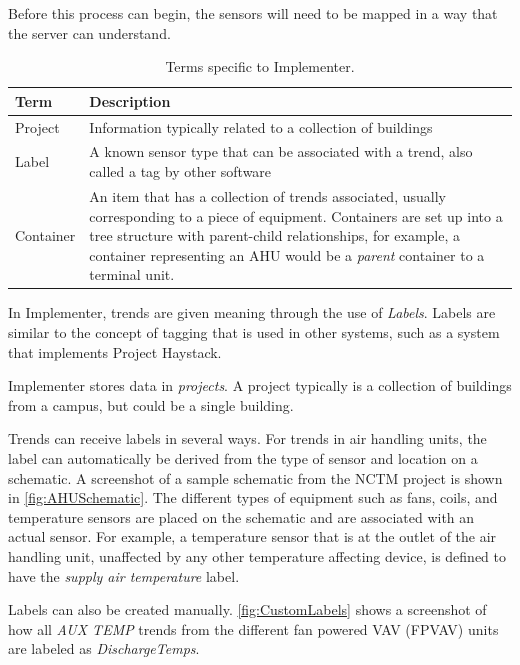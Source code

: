 Before this process can begin, the sensors will need to be mapped in a
way that the server can understand. 

\begin{table}
\centering
\caption{Terms specific to Implementer.}
\label{tab:ImplementerTerms}

\begin{tabular}{lp{5in}}
\toprule
    Term    & Description                                                                                      \\  \midrule
    Project & Information typically related to a collection of buildings                                       \\
    Label   & A known sensor type that can be associated with a trend, also called a tag by other software     \\
 Container  & An item that has a collection of trends associated,
 usually corresponding to a piece of equipment. Containers are set up into a tree
 structure with parent-child relationships, for example, a container
 representing an AHU would be a \textit{parent} container to a terminal
 unit. \\ \bottomrule
\end{tabular}

\end{table}

In Implementer, trends are given meaning through the use of
\textit{Labels}. Labels are similar to the concept of tagging that is used
in other systems, such as a system that implements Project Haystack. 

Implementer stores data in \textit{projects}. A project typically is a
collection of buildings from a campus, but could be a single building. 

Trends can receive labels in several ways. For trends in air handling
units, the label can automatically be derived from the type of sensor
and location on a schematic. A screenshot of a sample schematic from the
NCTM project is shown in \figref{} \ref{fig:AHUSchematic}. The different
types of equipment such as fans, coils, and temperature sensors are
placed on the schematic and are associated with an actual sensor. For
example, a temperature sensor that is at the outlet of the air handling
unit, unaffected by any other temperature affecting device, is defined
to have the \textit{supply air temperature} label. 

Labels can also be created manually. \figref{} \ref{fig:CustomLabels}
shows a screenshot of how all \textit{AUX TEMP} trends from the
different fan powered VAV (FPVAV) units are labeled as
\textit{DischargeTemps}.

